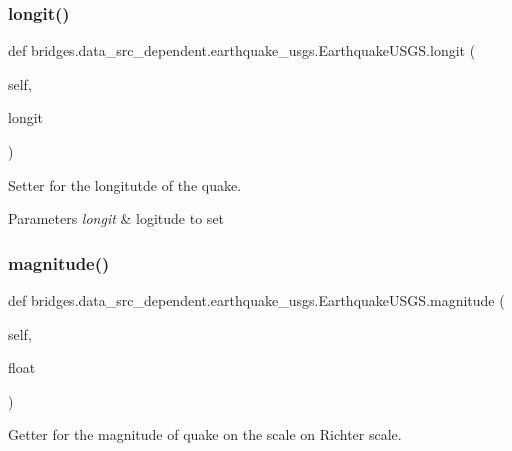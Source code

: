 \subsubsection{\texorpdfstring{longit()}{longit()}\hspace{0.1cm}{\footnotesize\ttfamily [2/2]}}
{\footnotesize\ttfamily def bridges.\+data\+\_\+src\+\_\+dependent.\+earthquake\+\_\+usgs.\+Earthquake\+U\+S\+G\+S.\+longit (\begin{DoxyParamCaption}\item[{}]{self,  }\item[{}]{longit }\end{DoxyParamCaption})}



Setter for the longitutde of the quake. 


\begin{DoxyParams}{Parameters}
{\em longit} & logitude to set \\
\hline
\end{DoxyParams}
\mbox{\label{classbridges_1_1data__src__dependent_1_1earthquake__usgs_1_1_earthquake_u_s_g_s_a2ada4ba221f09e4fd249ba53f5647d61}} 
\subsubsection{\texorpdfstring{magnitude()}{magnitude()}\hspace{0.1cm}{\footnotesize\ttfamily [1/2]}}
{\footnotesize\ttfamily def bridges.\+data\+\_\+src\+\_\+dependent.\+earthquake\+\_\+usgs.\+Earthquake\+U\+S\+G\+S.\+magnitude (\begin{DoxyParamCaption}\item[{}]{self,  }\item[{}]{float }\end{DoxyParamCaption})}



Getter for the magnitude of quake on the scale on Richter scale. 

